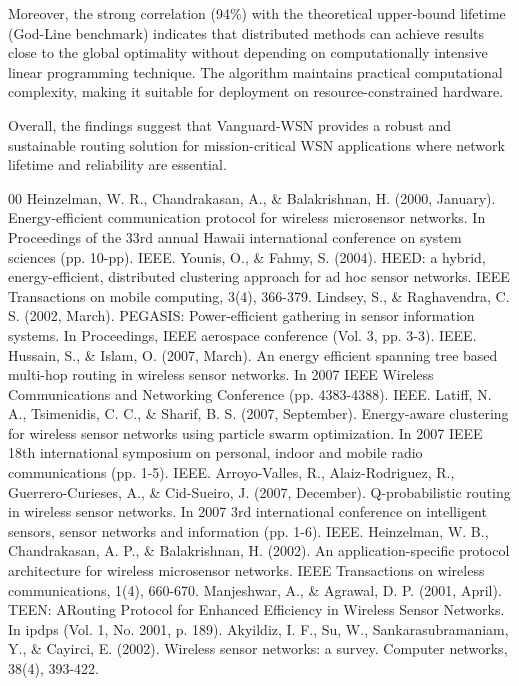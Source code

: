 \documentclass[conference]{IEEEtran}
\begin{document}
Moreover, the strong correlation (94\%) with the theoretical upper-bound lifetime (God-Line benchmark) indicates that distributed methods can achieve results close to the global optimality without depending on computationally intensive linear programming technique. The algorithm maintains practical computational complexity, making it suitable for deployment on resource-constrained hardware.

Overall, the findings suggest that Vanguard-WSN provides a robust and sustainable routing solution for mission-critical WSN applications where network lifetime and reliability are essential.

\begin{thebibliography}{00}
 Heinzelman, W. R., Chandrakasan, A., \& Balakrishnan, H. (2000, January). Energy-efficient communication protocol for wireless microsensor networks. In Proceedings of the 33rd annual Hawaii international conference on system sciences (pp. 10-pp). IEEE.
 Younis, O., \& Fahmy, S. (2004). HEED: a hybrid, energy-efficient, distributed clustering approach for ad hoc sensor networks. IEEE Transactions on mobile computing, 3(4), 366-379.
 Lindsey, S., \& Raghavendra, C. S. (2002, March). PEGASIS: Power-efficient gathering in sensor information systems. In Proceedings, IEEE aerospace conference (Vol. 3, pp. 3-3). IEEE.
 Hussain, S., \& Islam, O. (2007, March). An energy efficient spanning tree based multi-hop routing in wireless sensor networks. In 2007 IEEE Wireless Communications and Networking Conference (pp. 4383-4388). IEEE.
 Latiff, N. A., Tsimenidis, C. C., \& Sharif, B. S. (2007, September). Energy-aware clustering for wireless sensor networks using particle swarm optimization. In 2007 IEEE 18th international symposium on personal, indoor and mobile radio communications (pp. 1-5). IEEE.
 Arroyo-Valles, R., Alaiz-Rodriguez, R., Guerrero-Curieses, A., \& Cid-Sueiro, J. (2007, December). Q-probabilistic routing in wireless sensor networks. In 2007 3rd international conference on intelligent sensors, sensor networks and information (pp. 1-6). IEEE.
 Heinzelman, W. B., Chandrakasan, A. P., \& Balakrishnan, H. (2002). An application-specific protocol architecture for wireless microsensor networks. IEEE Transactions on wireless communications, 1(4), 660-670.
 Manjeshwar, A., \& Agrawal, D. P. (2001, April). TEEN: ARouting Protocol for Enhanced Efficiency in Wireless Sensor Networks. In ipdps (Vol. 1, No. 2001, p. 189).
 Akyildiz, I. F., Su, W., Sankarasubramaniam, Y., \& Cayirci, E. (2002). Wireless sensor networks: a survey. Computer networks, 38(4), 393-422.

\end{thebibliography}
\end{document}
